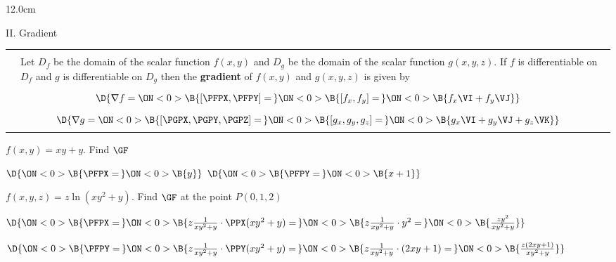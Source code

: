 \begin{frame}
\begin{columns}\begin{column}{12.0cm}

{II. Gradient}
\scriptsize
\begin{center}
{\setlength{\extrarowheight}{-0.2cm}
\begin{tabular}{|p{0.4cm}p{10.6cm}|}
	\hline
	\hline
	&\\
	\DEF & Let $D_f$ be the domain of the scalar function $f(x,y)$ and $D_g$ be the domain of the scalar function $g(x,y,z)$.  If $f$ is differentiable on $D_f$ and $g$ is differentiable on $D_g$ then the {\bf gradient} of $f(x,y)$ and $g(x,y,z)$ is given by \\
	&\\
	\multicolumn{2}{|c|}{$\D{\nabla f = 
	\ON<0>{\B{\left[\PFPX,\PFPY\right] =\,}} 
	\ON<0>{\B{\left[f_x,f_y\right] =\,}} 
	\ON<0>{\B{f_x \VI + f_y \VJ}}}$} \\
	& \\
	\multicolumn{2}{|c|}{$\D{\nabla g = 
	\ON<0>{\B{\left[\PGPX,\PGPY,\PGPZ\right] =\,}} 
	\ON<0>{\B{\left[g_x,g_y,g_z\right] =\,}} 
	\ON<0>{\B{g_x \VI + g_y \VJ + g_z \VK}}}$} \\
	& \\
	\hline
	\hline
\end{tabular}}
\end{center}
\EX $f(x,y) = xy + y$. \quad Find $\GF$

\vspace{0.2cm}

$\D{\ON<0>{\B{\PFPX =\,}} 
\ON<0>{\B{y}}}$ \quad 
{} \quad $\D{
\ON<0>{\B{\PFPY =\,}} 
\ON<0>{\B{x + 1}}}$ \quad 
{} \quad 
{}

\vspace{0.2cm}

\EX $f(x,y,z) = z\ln(xy^2 + y)$. \quad Find $\GF$ at the point $P(0,1,2)$

\vspace{0.1cm}

$\D{\ON<0>{\B{\PFPX =\,}} 
\ON<0>{\B{z\frac{1}{xy^2 + y}\cdot \PPX(xy^2 + y) = \,}} 
\ON<0>{\B{z\frac{1}{xy^2 + y}\cdot y^2 =\,}} 
\ON<0>{\B{\frac{zy^2}{xy^2 + y}}}}$

\vspace{0.1cm}

$\D{\ON<0>{\B{\PFPY = \,}}
\ON<0>{\B{z\frac{1}{xy^2 + y}\cdot \PPY(xy^2 + y) = \,}}
\ON<0>{\B{z\frac{1}{xy^2 + y}\cdot (2xy+1) =\,}}
\ON<0>{\B{\frac{z(2xy+1)}{xy^2 + y}}}}$


\end{column}
\end{columns}
\end{frame}
